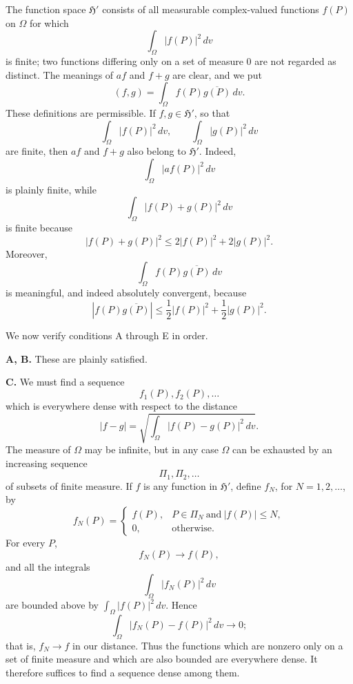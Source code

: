 ﻿\documentclass[paper=b5,fontsize=13pt,bookmarkpackage=false,twoside]{scrartcl}
\begin{document}
The function space $\mathfrak H'$ consists of all measurable complex-valued functions $f(P)$ on $\Omega$ for which
\[
\int_\Omega|f(P)|^2\,dv
\]
is finite; two functions differing only on a set of measure $0$ are not regarded as distinct. The meanings of $af$ and $f+g$ are clear, and we put
\[
(f,g)=\int_\Omega f(P)\overline{g(P)}\,dv.
\]
These definitions are permissible. If $f,g\in\mathfrak H'$, so that
\[
\int_\Omega|f(P)|^2\,dv,\qquad
\int_\Omega|g(P)|^2\,dv
\]
are finite, then $af$ and $f+g$ also belong to $\mathfrak H'$. Indeed,
\[
\int_\Omega|af(P)|^2\,dv
\]
is plainly finite, while
\[
\int_\Omega|f(P)+g(P)|^2\,dv
\]
is finite because
\[
|f(P)+g(P)|^2
\le2|f(P)|^2+2|g(P)|^2.
\]
Moreover,
\[
\int_\Omega f(P)\overline{g(P)}\,dv
\]
is meaningful, and indeed absolutely convergent, because
\[
|f(P)\overline{g(P)}|
\le\frac12|f(P)|^2+\frac12|g(P)|^2.
\]

We now verify conditions A through E in order.

\medskip
\noindent\textbf{A, B.}
These are plainly satisfied.

\medskip
\noindent\textbf{C.}
We must find a sequence
\[
f_1(P),f_2(P),\ldots
\]
which is everywhere dense with respect to the distance
\[
|f-g|
=\sqrt{\int_\Omega|f(P)-g(P)|^2\,dv}.
\]
The measure of $\Omega$ may be infinite, but in any case $\Omega$ can be exhausted by an increasing sequence
\[
\Pi_1,\Pi_2,\ldots
\]
of subsets of finite measure. If $f$ is any function in $\mathfrak H'$, define $f_N$, for $N=1,2,\ldots$, by
\[
f_N(P)=
\begin{cases}
f(P),&P\in\Pi_N\ \text{and}\ |f(P)|\le N,\\
0,&\text{otherwise}.
\end{cases}
\]
For every $P$,
\[
f_N(P)\longrightarrow f(P),
\]
and all the integrals
\[
\int_\Omega|f_N(P)|^2\,dv
\]
are bounded above by $\int_\Omega|f(P)|^2\,dv$. Hence
\[
\int_\Omega|f_N(P)-f(P)|^2\,dv\longrightarrow0;
\]
that is, $f_N\to f$ in our distance. Thus the functions which are nonzero only on a set of finite measure and which are also bounded are everywhere dense. It therefore suffices to find a sequence dense among them.
\end{document}
